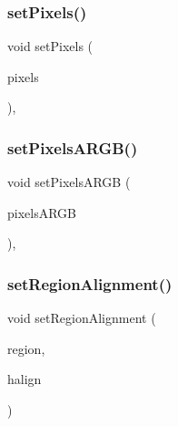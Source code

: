 \subsubsection{\texorpdfstring{set\+Pixels()}{setPixels()}}
{\footnotesize\ttfamily void set\+Pixels (\begin{DoxyParamCaption}\item[{const \mbox{\hyperlink{classGrid}{Grid}}$<$ int $>$ \&}]{pixels }\end{DoxyParamCaption})\hspace{0.3cm}{\ttfamily [virtual]}, {\ttfamily [inherited]}}

\mbox{\label{classGForwardDrawingSurface_a64dd4bc93e7f6555e9d96b956602c7c8}} 
\subsubsection{\texorpdfstring{set\+Pixels\+A\+R\+G\+B()}{setPixelsARGB()}}
{\footnotesize\ttfamily void set\+Pixels\+A\+R\+GB (\begin{DoxyParamCaption}\item[{const \mbox{\hyperlink{classGrid}{Grid}}$<$ int $>$ \&}]{pixels\+A\+R\+GB }\end{DoxyParamCaption})\hspace{0.3cm}{\ttfamily [virtual]}, {\ttfamily [inherited]}}

\mbox{\label{classGWindow_a96e9f5593c0193bbdc7ae99945b9cf5f}} 
\subsubsection{\texorpdfstring{set\+Region\+Alignment()}{setRegionAlignment()}\hspace{0.1cm}{\footnotesize\ttfamily [1/5]}}
{\footnotesize\ttfamily void set\+Region\+Alignment (\begin{DoxyParamCaption}\item[{\mbox{\hyperlink{classGWindow_a81a01a86de31071a92e6cce0bab9bc4b}{Region}}}]{region,  }\item[{Horizontal\+Alignment}]{halign }\end{DoxyParamCaption})\hspace{0.3cm}{\ttfamily [virtual]}}



